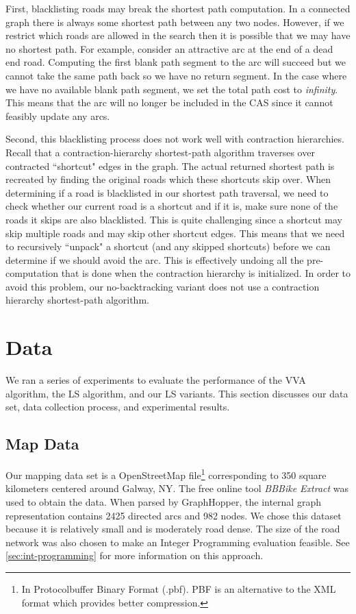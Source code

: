 \documentclass[honors]{union-cs-thesis}
\begin{document}
First, blacklisting roads may break the shortest path computation. In a connected graph there is always some shortest path between any two nodes. However, if we restrict which roads are allowed in the search then it is possible that we may have no shortest path. For example, consider an attractive arc at the end of a dead end road. Computing the first blank path segment to the arc will succeed but we cannot take the same path back so we have no return segment. In the case where we have no available blank path segment, we set the total path cost to \emph{infinity}. This means that the arc will no longer be included in the CAS since it cannot feasibly update any arcs. 

Second, this blacklisting process does not work well with contraction hierarchies. Recall that a contraction-hierarchy shortest-path algorithm traverses over contracted ``shortcut" edges in the graph. The actual returned shortest path is recreated by finding the original roads which these shortcuts skip over. When determining if a road is blacklisted in our shortest path traversal, we need to check whether our current road is a shortcut and if it is, make sure none of the roads it skips are also blacklisted. This is quite challenging since a shortcut may skip multiple roads and may skip other shortcut edges. This means that we need to recursively ``unpack" a shortcut (and any skipped shortcuts)  before we can determine if we should avoid the arc. This is effectively undoing all the pre-computation that is done when the contraction hierarchy is initialized. In order to avoid this problem, our no-backtracking variant does not use a contraction hierarchy shortest-path algorithm.


\section{Data}
\label{sec:data}
We ran a series of experiments to evaluate the performance of the VVA algorithm, the LS algorithm, and our LS variants. This section discusses our data set, data collection process, and experimental results.

\subsection{Map Data}
Our mapping data set is a OpenStreetMap file\footnote{In Protocolbuffer Binary Format (.pbf). PBF is an alternative to the XML format which provides better compression.} corresponding to 350 square kilometers centered around Galway, NY. The free online tool \emph{BBBike Extract} \cite{bbbike} was used to obtain the data. When parsed by GraphHopper, the internal graph representation contains 2425 directed arcs and 982 nodes. We chose this dataset because it is relatively small and is moderately road dense. The size of the road network was also chosen to make an Integer Programming evaluation feasible. See \cref{sec:int-programming} for more information on this approach.
\end{document}
